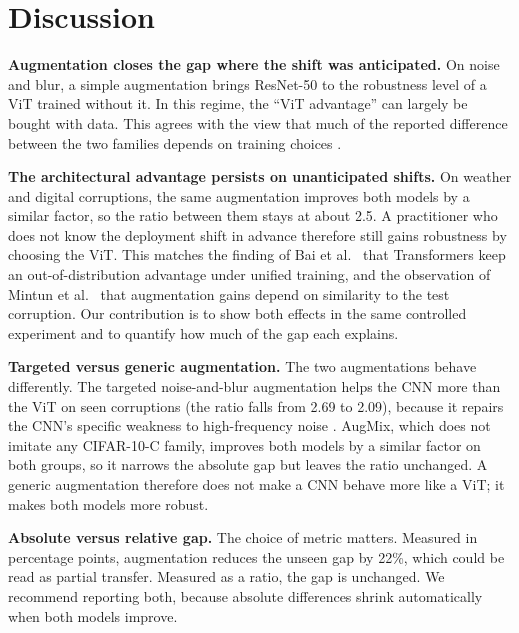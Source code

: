 \documentclass[a4paper,11pt]{article}
\begin{document}
\section{Discussion}
\label{sec:discussion}

\textbf{Augmentation closes the gap where the shift was anticipated.} On noise and blur, a simple augmentation brings ResNet-50 to the robustness level of a ViT trained without it. In this regime, the ``ViT advantage'' can largely be bought with data. This agrees with the view that much of the reported difference between the two families depends on training choices \cite{bai2021transformers,pinto2022impartial}.

\textbf{The architectural advantage persists on unanticipated shifts.} On weather and digital corruptions, the same augmentation improves both models by a similar factor, so the ratio between them stays at about 2.5. A practitioner who does not know the deployment shift in advance therefore still gains robustness by choosing the ViT. This matches the finding of Bai et al.\ \cite{bai2021transformers} that Transformers keep an out-of-distribution advantage under unified training, and the observation of Mintun et al.\ \cite{mintun2021interaction} that augmentation gains depend on similarity to the test corruption. Our contribution is to show both effects in the same controlled experiment and to quantify how much of the gap each explains.

\textbf{Targeted versus generic augmentation.} The two augmentations behave differently. The targeted noise-and-blur augmentation helps the CNN more than the ViT on seen corruptions (the ratio falls from 2.69 to 2.09), because it repairs the CNN's specific weakness to high-frequency noise \cite{yin2019fourier}. AugMix, which does not imitate any CIFAR-10-C family, improves both models by a similar factor on both groups, so it narrows the absolute gap but leaves the ratio unchanged. A generic augmentation therefore does not make a CNN behave more like a ViT; it makes both models more robust.

\textbf{Absolute versus relative gap.} The choice of metric matters. Measured in percentage points, augmentation reduces the unseen gap by 22\%, which could be read as partial transfer. Measured as a ratio, the gap is unchanged. We recommend reporting both, because absolute differences shrink automatically when both models improve.
\end{document}
